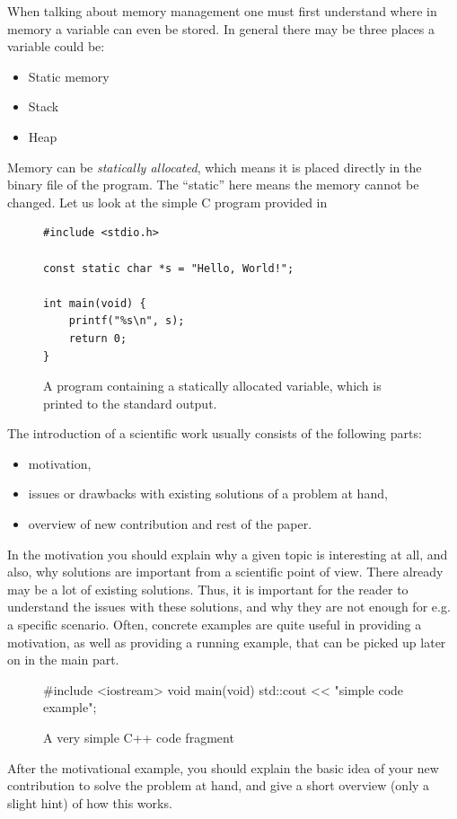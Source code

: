 \documentclass[twocolumn]{article}
\begin{document}
When talking about memory management one must first understand where in memory
a variable can even be stored.
In general there may be three places a variable could be:
\begin{itemize}
        \item Static memory
        \item Stack
        \item Heap
\end{itemize}
Memory can be \textit{statically allocated}, which means it is placed directly in
the binary file of the program. The ``static'' here means the memory cannot be changed.
Let us look at the simple C program provided in 
\begin{figure}
\begin{verbatim}
#include <stdio.h>

const static char *s = "Hello, World!";

int main(void) {
    printf("%s\n", s);
    return 0;
}
\end{verbatim}
\vspace{-2em}
    \caption{A program containing a statically allocated variable, which is printed to the standard output.}
    \label{staticexample}
\end{figure}
The introduction of a scientific work usually consists of the following
parts:
\begin{itemize}
	\item motivation,
	\item issues or drawbacks with existing solutions of a problem at hand,
	\item overview of new contribution and rest of the paper.
\end{itemize}
In the motivation you should explain why a given topic is interesting
at all, and also, why solutions are important from a scientific point
of view. There already may be a lot of existing solutions. Thus, it
is important for the reader to understand the issues with these solutions,
and why they are not enough for e.g. a specific scenario. Often, concrete
examples are quite useful in providing a motivation, as well as providing
a running example, that can be picked up later on in the main part.
\begin{figure}
\begin{cppcode}
#include <iostream>
void main(void){
  std::cout << "simple code example";
}
\end{cppcode}

\vspace{-2em}
\caption{A very simple C++ code fragment}
\label{introexample}
\end{figure}
After the motivational example, you should explain the basic idea of your new
contribution to solve the problem at hand, and give a short overview
(only a slight hint) of how this works.
\end{document}
